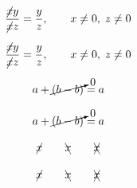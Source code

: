 \begin{referencecode}
\usepackage{amsmath,cancel}
\end{referencecode}
\begin{referencecode}
\[
    \frac{\cancel{x}y}{\cancel{x}z}
    = \frac{y}{z},
    \qquad x \ne 0,\; z \ne 0
\]
\end{referencecode}

\[
    \frac{\cancel{x}y}{\cancel{x}z}
    = \frac{y}{z},
    \qquad x \ne 0,\; z \ne 0
\]

\begin{referencecode}
\[
    a + \cancelto{0}{(b-b)} = a
\]
\end{referencecode}

\[
    a + \cancelto{0}{(b-b)} = a
\]

\begin{referencecode}
\[
    \cancel{x} \qquad \bcancel{x} \qquad \xcancel{x}
\]
\end{referencecode}

\[
    \cancel{x} \qquad \bcancel{x} \qquad \xcancel{x}
\]

